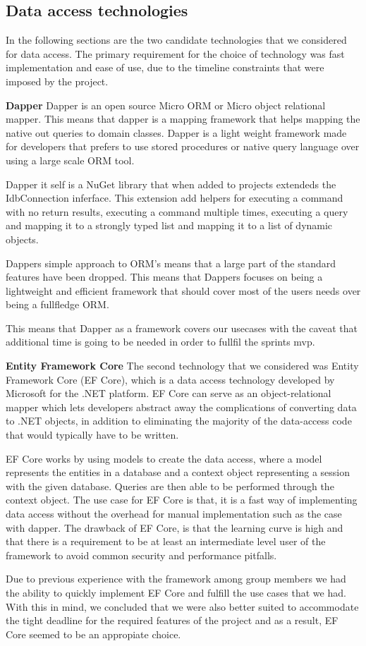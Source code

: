 \subsection{Data access technologies}
In the following sections are the two candidate technologies that we considered for data access.
The primary requirement for the choice of technology was fast implementation and ease of use, due to the timeline constraints that were imposed by the \knox project. 

\textbf{Dapper}
Dapper is an open source Micro ORM or Micro object relational mapper. This means that dapper is a mapping framework that helps mapping the native out queries to domain classes. Dapper is a light weight framework made for developers that prefers to use stored procedures or native query language over using a large scale ORM tool. 

Dapper it self is a NuGet library that when added to projects extendeds the IdbConnection inferface. This extension add helpers for executing a command with no return results, executing a command multiple times, executing a query and mapping it to a strongly typed list and mapping it to a list of dynamic objects. \cite{Dapper_Git}

Dappers simple approach to ORM's means that a large part of the standard features have been dropped. This means that Dappers focuses on being a lightweight and efficient framework that should cover most of the users needs over being a fullfledge ORM.\cite{Dapper_Git} 

This means that Dapper as a framework covers our usecases with the caveat that additional time is going to be needed in order to fullfil the sprints mvp. 

\textbf{Entity Framework Core}
The second technology that we considered was Entity Framework Core (EF Core), which is a data access technology developed by Microsoft for the .NET platform. EF Core can serve as an object-relational mapper \cite{ORM} which lets developers abstract away the complications of converting data to .NET objects, in addition to eliminating the majority of the data-access code that would typically have to be written.

EF Core works by using models to create the data access, where a model represents the entities in a database and a context object representing a session with the given database. Queries are then able to be performed through the context object. 
The use case for EF Core is that, it is a fast way of implementing data access without the overhead for manual implementation such as the case with dapper. 
The drawback of EF Core, is that the learning curve is high and that there is a requirement to be at least an intermediate level user of the framework to avoid common security and performance pitfalls. \cite{EFCore}

Due to previous experience with the framework among group members we had the ability to quickly implement EF Core and fulfill the use cases that we had. With this in mind, we concluded that we were also better suited to accommodate the tight deadline for the required features of the \knox{} project and as a result, EF Core seemed to be an appropiate choice.


